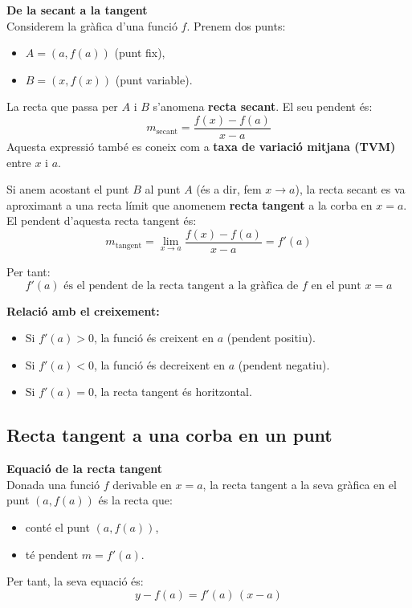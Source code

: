 \documentclass[12pt]{article}
\begin{document}
\begin{concept}
\textbf{De la secant a la tangent}\\
Considerem la gràfica d'una funció $f$. Prenem dos punts:
\begin{itemize}
    \item $A=(a,f(a))$ (punt fix),
    \item $B=(x,f(x))$ (punt variable).
\end{itemize}
La recta que passa per $A$ i $B$ s'anomena \textbf{recta secant}. El seu pendent és:
\[
m_{\text{secant}}=\frac{f(x)-f(a)}{x-a}
\]
Aquesta expressió també es coneix com a \textbf{taxa de variació mitjana (TVM)} entre $x$ i $a$.

Si anem acostant el punt $B$ al punt $A$ (és a dir, fem $x\to a$), la recta secant es va aproximant a una recta límit que anomenem \textbf{recta tangent} a la corba en $x=a$. El pendent d'aquesta recta tangent és:
\[
m_{\text{tangent}}=\lim_{x\to a} \frac{f(x)-f(a)}{x-a}=f'(a)
\]

Per tant:
\[
\boxed{f'(a) \text{ és el pendent de la recta tangent a la gràfica de } f \text{ en el punt } x=a}
\]

\textbf{Relació amb el creixement:}
\begin{itemize}
    \item Si $f'(a)>0$, la funció és creixent en $a$ (pendent positiu).
    \item Si $f'(a)<0$, la funció és decreixent en $a$ (pendent negatiu).
    \item Si $f'(a)=0$, la recta tangent és horitzontal.
\end{itemize}
\end{concept}


\subsection{Recta tangent a una corba en un punt}

\begin{concept}
\textbf{Equació de la recta tangent}\\
Donada una funció $f$ derivable en $x=a$, la recta tangent a la seva gràfica en el punt $(a,f(a))$ és la recta que:
\begin{itemize}
    \item conté el punt $(a,f(a))$,
    \item té pendent $m=f'(a)$.
\end{itemize}
Per tant, la seva equació és:
\[
\boxed{y-f(a)=f'(a)\,(x-a)}
\]
\end{concept}
\end{document}
